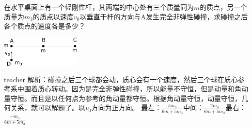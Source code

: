 \begin{example}
在水平桌面上有一个轻刚性杆，其两端的中心处有三个质量同为$m$的质点，另一个质量为$m_3$的质点以速度$v_0$以垂直于杆的方向与A发生完全非弹性碰撞，求碰撞之后各个质点的速度各是多少？
	\begin{flushright}
		\includegraphics[width = 0.3\textwidth]{images/ang-momontum-1.pdf} 
	\end{flushright}
\begin{taggedblock}{teacher}
\noindent
解析：碰撞之后三个球都会动，质心会有一个速度，然后三个球在质心参考系中围着质心转动。因为是完全非弹性碰撞，所以能量不守恒，但是动量和角动量守恒。而且是以任何点为参考的角动量都守恒。根据角动量守恒，动量守恒，几何关系，就可以解题了。以$v_0$方向为正方向。
最左：$\frac{5m_3}{6m+5m_3}$中间：$\frac{2m_3}{6m+5m_3}$最右：$\frac{-m_3}{6m+5m_3}$
\end{taggedblock}
\end{example}





